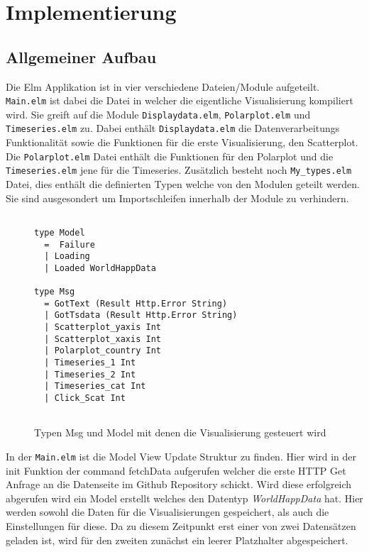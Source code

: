 \section{Implementierung}
\subsection{Allgemeiner Aufbau}
Die Elm Applikation ist in vier verschiedene Dateien/Module aufgeteilt. \texttt{Main.elm} ist dabei die Datei in welcher die eigentliche Visualisierung kompiliert wird. 
Sie greift auf die Module \texttt{Displaydata.elm}, \texttt{Polarplot.elm} und \texttt{Timeseries.elm} zu. 
Dabei enthält \texttt{Displaydata.elm} die Datenverarbeitungs Funktionalität sowie die Funktionen für die erste Visualisierung, den Scatterplot. 
Die \texttt{Polarplot.elm} Datei enthält die Funktionen für den Polarplot 
und die \break \texttt{Timeseries.elm} jene für die Timeseries.  Zusätzlich besteht noch \texttt{My\_types.elm} Datei, dies enthält die definierten Typen welche von den Modulen geteilt werden. Sie sind ausgesondert um Importschleifen innerhalb der Module zu verhindern.\\

\begin{figure}[ht]
\centering
\begin{mdframed}[backgroundcolor=backcolour]
\begin{verbatim}

type Model 
  =  Failure
  | Loading
  | Loaded WorldHappData

type Msg
  = GotText (Result Http.Error String)
  | GotTsdata (Result Http.Error String)
  | Scatterplot_yaxis Int
  | Scatterplot_xaxis Int
  | Polarplot_country Int
  | Timeseries_1 Int
  | Timeseries_2 Int
  | Timeseries_cat Int
  | Click_Scat Int
  
\end{verbatim}
\end{mdframed}
    \caption{Typen Msg und Model mit denen die Visualisierung gesteuert wird}
    \label{fig:Msg_Model}
\end{figure}

In der \texttt{Main.elm} ist die Model View Update Struktur zu finden. 
Hier wird in der init Funktion der command fetchData aufgerufen welcher die erste HTTP Get Anfrage an die Datenseite im Github Repository schickt. 
Wird diese erfolgreich abgerufen wird ein Model erstellt welches den Datentyp \textit{WorldHappData} hat. 
Hier werden sowohl die Daten für die Visualisierungen gespeichert, als auch die Einstellungen für diese. Da zu diesem Zeitpunkt erst einer von zwei Datensätzen geladen ist, wird für den zweiten zunächst ein leerer Platzhalter abgespeichert. \\

